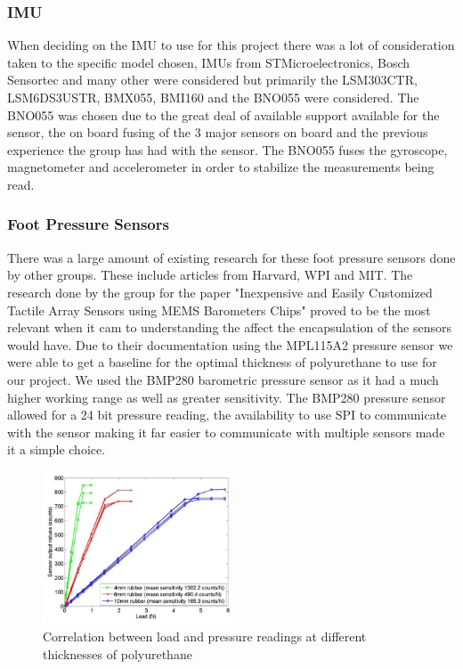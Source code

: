     
\subsubsection{IMU}
    When deciding on the IMU to use for this project there was a lot of consideration taken to the specific model chosen, IMUs from STMicroelectronics, Bosch Sensortec and many other were considered but primarily the LSM303CTR, LSM6DS3USTR, BMX055, BMI160 and the BNO055\cite{BNO055} were considered. The BNO055 was chosen due to the great deal of available support available for the sensor, the on board fusing of the 3 major sensors on board and the previous experience the group has had with the sensor. The BNO055 fuses the gyroscope, magnetometer and accelerometer in order to stabilize the measurements being read.  
    
\subsubsection{Foot Pressure Sensors}
There was a large amount of existing research for these foot pressure sensors done by other groups. These include articles from Harvard\cite{chuah2012composite}\cite{chuah2014enabling}, WPI\cite{youssefian2014contact} and MIT\cite{tenzer2014inexpensive}. The research done by the group for the paper "Inexpensive and Easily Customized Tactile Array Sensors using MEMS Barometers Chips" \cite{chuah2012composite} proved to be the most relevant when it cam to understanding the affect the encapsulation of the sensors would have. Due to their documentation using the MPL115A2 pressure sensor we were able to get a baseline for the optimal thickness of polyurethane to use for our project. We used the BMP280 barometric pressure sensor \cite{BMP280} as it had a much higher working range as well as greater sensitivity. The BMP280 pressure sensor allowed for a 24 bit pressure reading, the availability to use SPI to communicate with the sensor making it far easier to communicate with multiple sensors made it a simple choice.
\begin{figure}[H]
    \centering
    \includegraphics[width=0.5\textwidth]{figures/Load_vs_SensorvsThickness.png}
    \caption{Correlation between load and pressure readings at different thicknesses of polyurethane\cite{chuah2012composite}}
    \label{fig:ThicknessVSPressure}
\end{figure}

